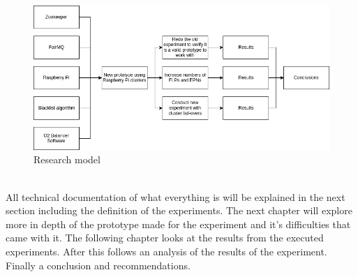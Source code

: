 \begin{figure}[htb]
	\centering
	\includegraphics[width=\textwidth,height=\textheight,keepaspectratio]{./graphics/ResearchModel.png}
	\caption{Research model}
	\label{fig:ResearchModel}
\end{figure}

~\\ All technical documentation of what everything is will be explained in the next section including the definition of the experiments.
The next chapter will explore more in depth of the prototype made for the experiment and it's difficulties that came with it. The following chapter looks at the results from the  executed experiments. After this follows an analysis of the results of the experiment. Finally a conclusion and recommendations.